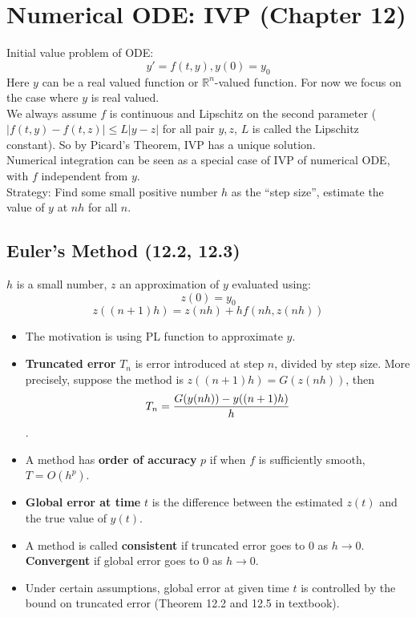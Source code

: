 \documentclass{article} %
\theoremstyle{break}
\begin{document}
\section{Numerical ODE: IVP (Chapter 12)}

Initial value problem of ODE:
\[y'=f(t, y), y(0)=y_0\]
Here $y$ can be a real valued function or $\mathbb{R}^n$-valued function. For now we focus on the case where $y$ is real valued.\\

We always assume $f$ is continuous and Lipschitz on the second parameter ($|f(t, y)-f(t, z)|\leq L|y-z|$ for all pair $y, z$, $L$ is called the Lipschitz constant). So by Picard's Theorem, IVP has a unique solution.\\

Numerical integration can be seen as a special case of IVP of numerical ODE, with $f$ independent from $y$.\\

Strategy: Find some small positive number $h$ as the ``step size'', estimate the value of $y$ at $nh$ for all $n$.\\


\subsection{Euler's Method (12.2, 12.3)}

$h$ is a small number, $z$ an approximation of $y$ evaluated using:
\[z(0)=y_0\]
\[z((n+1)h)=z(nh)+hf(nh, z(nh))\]

\begin{itemize}
\item The motivation is using PL function to approximate $y$.
\item {\bf Truncated error} $T_n$ is error introduced at step $n$, divided by step size. More precisely, suppose the method is $z((n+1)h)=G(z(nh))$, then
  \[T_n={G(y(nh))-y((n+1)h)\over h}\]. 
\item A method has {\bf order of accuracy} $p$ if when $f$ is sufficiently smooth, $T=O(h^p)$.
\item {\bf Global error at time} $t$ is the difference between the estimated $z(t)$ and the true value of $y(t)$.
\item A method is called {\bf consistent} if truncated error goes to $0$ as $h\rightarrow 0$. {\bf Convergent} if global error goes to $0$ as $h\rightarrow 0$.
\item Under certain assumptions, global error at given time $t$ is controlled by the bound on truncated error (Theorem 12.2 and 12.5 in textbook).
\end{itemize}
\end{document}
